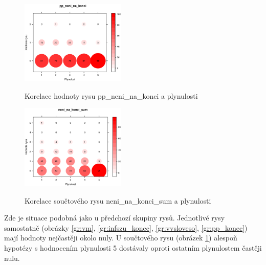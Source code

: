 \documentclass[12pt,a4paper]{report}
\begin{document}
\begin{figure}[!htb]
\begin{center}
  \centering\includegraphics[width=50mm]{./grafy/rysy/pp_neni_na_konci-c.eps}
  \caption{Korelace hodnoty rysu pp\_neni\_na\_konci a plynulosti}\label{gr:pp_konec}
\endminipage\quad
{} 
  \centering\includegraphics[width=50mm]{./grafy/rysy/neni_na_konci_sum-c.eps}
  \caption{Korelace součtového rysu neni\_na\_konci\_sum a plynulosti}\label{gr:sumneni}
\endminipage
\end{center}
\end{figure}


Zde je situace podobná jako u předchozí skupiny rysů. Jednotlivé rysy samostatně (obrázky \ref{gr:vm}, \ref{gr:infszu_konec}, \ref{gr:vvsloveso}, \ref{gr:pp_konec}) mají hodnoty nejčastěji okolo nuly. U součtového rysu (obrázek \ref{gr:sumneni}) alespoň hypotézy s hodnocením plynulosti 5 dostávaly oproti ostatním plynulostem častěji nulu.
\end{document}
